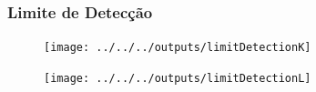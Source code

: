 \begin{frame}
  \frametitle{Limite de Detecção}
  \begin{figure}[H]
  \centering
    \begin{minipage}[b]{0.40\linewidth}
      \texttt{[image: ../../../outputs/limitDetectionK]}
    \end{minipage}
    \quad
    \begin{minipage}[b]{0.40\linewidth}
      \texttt{[image: ../../../outputs/limitDetectionL]}
    \end{minipage}
  \end{figure}
\end{frame}

